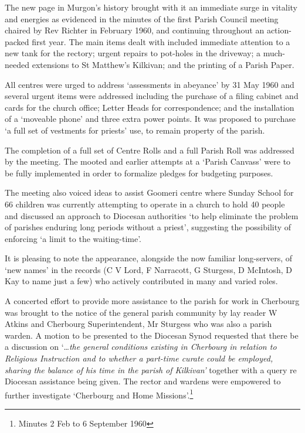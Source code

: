 The new page in Murgon's history brought with it an immediate surge in vitality and energies as evidenced in the minutes of the first Parish Council meeting chaired by Rev Richter in February 1960, and continuing throughout an action-packed first year. The main items dealt with included immediate attention to a new tank for the rectory; urgent repairs to pot-holes in the driveway; a much-needed extensions to St Matthew's Kilkivan; and the printing of a Parish Paper.



All centres were urged to address `assessments in abeyance' by 31 May 1960 and several urgent items were addressed including the purchase of a filing cabinet and cards for the church office; Letter Heads for correspondence; and the installation of a `moveable phone' and three extra power points. It was proposed to purchase `a full set of vestments for priests' use, to remain property of the parish.



The completion of a full set of Centre Rolls and a full Parish Roll was addressed by the meeting. The mooted and earlier attempts at a `Parish Canvass' were to be fully implemented in order to formalize pledges for budgeting purposes.



The meeting also voiced ideas to assist Goomeri centre where Sunday School for 66 children was currently attempting to operate in a church to hold 40 people and discussed an approach to Diocesan authorities `to help eliminate the problem of parishes enduring long periods without a priest', suggesting the possibility of enforcing `a limit to the waiting-time'.



It is pleasing to note the appearance, alongside the now familiar long-servers, of `new names' in the records (C V Lord, F Narracott, G Sturgess, D McIntosh, D Kay to name just a few) who actively contributed in many and varied roles.



A concerted effort to provide more assistance to the parish for work in Cherbourg was brought to the notice of the general parish community by lay reader W Atkins and Cherbourg Superintendent, Mr Sturgess who was also a parish warden. A motion to be presented to the Diocesan Synod requested that there be a discussion on `\ldots{}\emph{the general conditions existing in Cherbourg in relation to Religious Instruction and to whether a part-time curate could be employed, sharing the balance of his time in the parish of Kilkivan'} together with a query re Diocesan assistance being given. The rector and wardens were empowered to further investigate `Cherbourg and Home Missions'.\footnote{Minutes 2 Feb to 6 September 1960}


